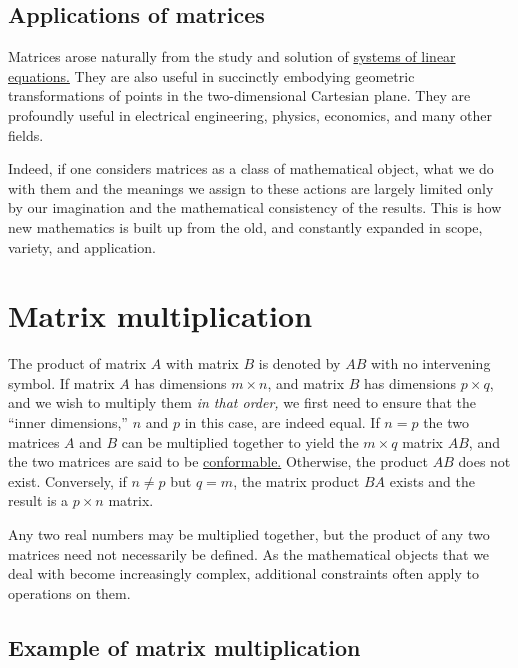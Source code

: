 \documentclass[
  a4paper,
]{article}
\begin{document}
\hypertarget{applications-of-matrices}{%
\subsection{Applications of matrices}\label{applications-of-matrices}}

Matrices arose naturally from the study and solution of
\href{http://mathworld.wolfram.com/LinearSystemofEquations.html}{systems
of linear equations.} They are also useful in succinctly embodying
geometric transformations of points in the two-dimensional Cartesian
plane. They are profoundly useful in electrical engineering, physics,
economics, and many other fields.

Indeed, if one considers matrices as a class of mathematical object,
what we do with them and the meanings we assign to these actions are
largely limited only by our imagination and the mathematical consistency
of the results. This is how new mathematics is built up from the old,
and constantly expanded in scope, variety, and application.

\hypertarget{matrix-multiplication}{%
\section{Matrix multiplication}\label{matrix-multiplication}}

The product of matrix \(A\) with matrix \(B\) is denoted by \(AB\) with
no intervening symbol. If matrix \(A\) has dimensions \(m \times n\),
and matrix \(B\) has dimensions \(p \times q\), and we wish to multiply
them \emph{in that order,} we first need to ensure that the ``inner
dimensions,'' \(n\) and \(p\) in this case, are indeed equal. If
\(n = p\) the two matrices \(A\) and \(B\) can be multiplied together to
yield the \(m \times q\) matrix \(AB\), and the two matrices are said to
be \href{http://en.wikipedia.org/wiki/Conformable_matrix}{conformable.}
Otherwise, the product \(AB\) does not exist. Conversely, if
\(n \neq p\) but \(q = m\), the matrix product \(BA\) exists and the
result is a \(p \times n\) matrix.

Any two real numbers may be multiplied together, but the product of any
two matrices need not necessarily be defined. As the mathematical
objects that we deal with become increasingly complex, additional
constraints often apply to operations on them.

\hypertarget{example-of-matrix-multiplication}{%
\subsection{Example of matrix
multiplication}\label{example-of-matrix-multiplication}}
\end{document}
